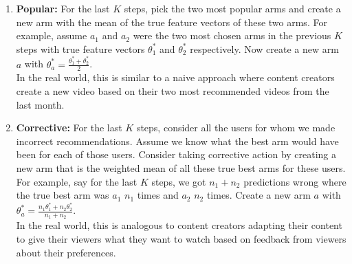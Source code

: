 \begin{enumerate}[(1)]
\item
\textbf{Popular:} For the last $K$ steps, pick the two most popular arms and create a new arm with the mean of the true feature vectors of these two arms. For example, assume $a_1$ and $a_2$ were the two most chosen arms in the previous $K$ steps with true feature vectors $\theta_1^*$ and $\theta^*_2$ respectively. Now create a new arm $a$ with $\theta_a^* = \frac{\theta_1^* + \theta_2^*}{2}$.\\
In the real world, this is similar to a naive approach where content creators create a new video based on their two most recommended videos from the last month.
\item
\textbf{Corrective:} For the last $K$ steps, consider all the users for whom we made incorrect recommendations. Assume we know what the best arm would have been for each of those users. Consider taking corrective action by creating a new arm that is the weighted mean of all these true best arms for these users. For example, say for the last $K$ steps, we got $n_1 + n_2$ predictions wrong where the true best arm was $a_1$ $n_1$ times and $a_2$ $n_2$ times. Create a new arm $a$ with $\theta_a^* = \frac{n_1\theta_1^* + n_2\theta_2^*}{n_1 + n_2}$. \\
In the real world, this is analogous to content creators adapting their content to give their viewers what they want to watch based on feedback from viewers about their preferences.


\end{enumerate}
